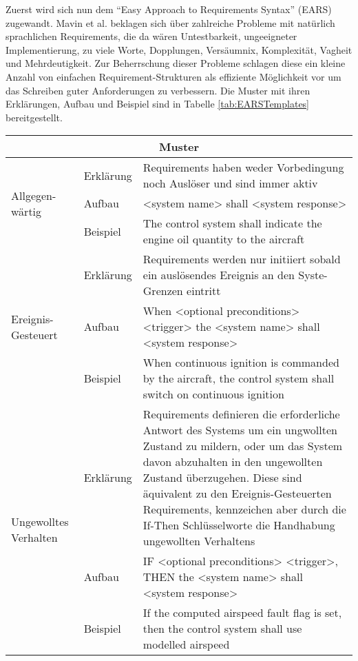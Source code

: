 Zuerst wird sich nun dem "`Easy Approach to Requirements Syntax"' (EARS) zugewandt. Mavin et al. beklagen sich über zahlreiche Probleme mit natürlich sprachlichen Requirements, die da wären Untestbarkeit, ungeeigneter Implementierung, zu viele Worte, Dopplungen, Versäumnix, Komplexität, Vagheit und Mehrdeutigkeit. Zur Beherrschung dieser Probleme schlagen diese ein kleine Anzahl von einfachen Requirement-Strukturen als effiziente Möglichkeit vor um das Schreiben guter Anforderungen zu verbessern. Die Muster mit ihren Erklärungen, Aufbau und Beispiel sind in Tabelle \ref{tab:EARSTemplates} bereitgestellt.
\begin{table}[]
	\centering
	\begin{tabularx}{\textwidth}{p{}|p{}|p{}} 
		\hline
		\multicolumn{3}{c}{Muster}  \\ \hline
		\multirow{3}{0.0\textwidth}{Allgegen-wärtig} & Erklärung & Requirements haben weder Vorbedingung noch Auslöser und sind immer aktiv \\ \cline{2-3}
		 & Aufbau  & <system name> shall <system response> \\ \cline{2-3}
		 & Beispiel & The control system shall indicate the engine oil quantity to the aircraft \\ \hline
		\multirow{3}{0.0\textwidth}{Ereignis-Gesteuert} & Erklärung & Requirements werden nur initiiert sobald ein auslösendes Ereignis an den Syste-Grenzen eintritt \\ \cline{2-3}
		& Aufbau  & When <optional preconditions> <trigger> the <system name> shall <system response> \\ \cline{2-3}
		& Beispiel & When continuous ignition is commanded by the aircraft, the control system shall switch on continuous ignition \\ \hline
		\multirow{3}{0.0\textwidth}{Ungewolltes Verhalten} & Erklärung & Requirements definieren die erforderliche Antwort des Systems um ein ungwollten Zustand zu mildern, oder um das System davon abzuhalten in den ungewollten Zustand überzugehen. Diese sind äquivalent zu den Ereignis-Gesteuerten Requirements, kennzeichen aber durch die If-Then Schlüsselworte die Handhabung ungewollten Verhaltens \\ \cline{2-3}
		& Aufbau  & IF <optional preconditions> <trigger>, THEN the <system name> shall <system response> \\ \cline{2-3}
		& Beispiel & If the computed airspeed fault flag is set, then the control system shall use modelled airspeed \\ \hline

\end{tabularx}
\end{table}
